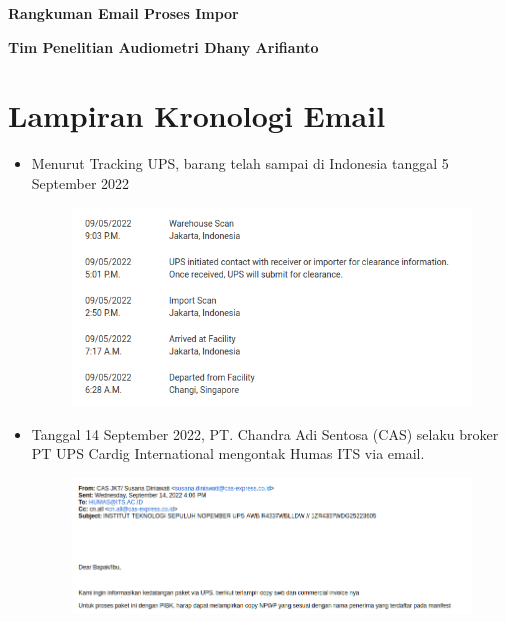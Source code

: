 \documentclass{article} %
\begin{document}
	\begin{titlepage}
		
		\centering %
		
		{
			\LARGE %
			\bf %
			Rangkuman Email Proses Impor
		}
		
		\bigskip
		{\Large \bf Tim Penelitian Audiometri Dhany Arifianto}
		\vfill %
	\end{titlepage}

	\newpage
	\section{Lampiran Kronologi Email}
	
	\begin{itemize}
		\item Menurut Tracking UPS, barang telah sampai di Indonesia tanggal 5 September 2022
		
		\begin{figure}[!ht]
			\centering
			\includegraphics[width=400pt]{images/impor_0}
		\end{figure}
	
		\item Tanggal 14 September 2022, PT. Chandra Adi Sentosa (CAS) selaku broker PT UPS Cardig International mengontak Humas ITS via email.
		
		\begin{figure}[!ht]
			\centering
			\includegraphics[width=400pt]{images/impor_1}
		\end{figure}
	

\end{itemize}
\end{document}

